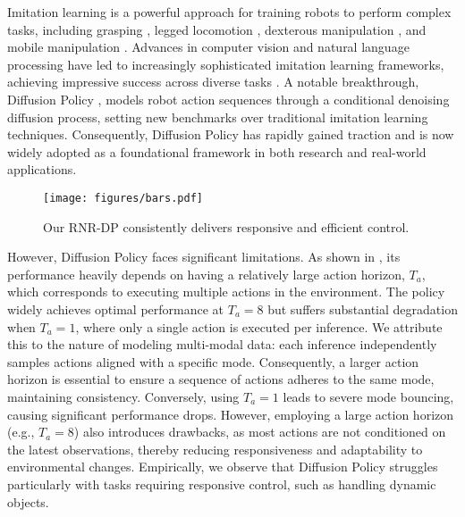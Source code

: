 Imitation learning is a powerful approach for training robots to perform complex tasks, including grasping \citep{johns2021coarse, xie2020deep, stepputtis2020language}, legged locomotion \citep{ratliff2007imitation, al2023locomujoco, yang2023generalized}, dexterous manipulation \citep{qin2022dexmv, radosavovic2021state}, and mobile manipulation \citep{wong2022error, du2022bayesian}. Advances in computer vision and natural language processing have led to increasingly sophisticated imitation learning frameworks, achieving impressive success across diverse tasks \citep{chen2021decision, abramson1970aloha, florence2022implicit, shafiullah2022behavior}. A notable breakthrough, Diffusion Policy \citep{chi2023diffusion}, models robot action sequences through a conditional denoising diffusion process, setting new benchmarks over traditional imitation learning techniques. Consequently, Diffusion Policy has rapidly gained traction and is now widely adopted as a foundational framework in both research and real-world applications.

\begin{wrapfigure}{r}{0.35\textwidth}
    \centering
    \vspace{-\baselineskip}
    \texttt{[image: figures/bars.pdf]}
    \vspace{-20pt}
    \caption{Our RNR-DP consistently delivers responsive and efficient control.}
    \label{fig:bars}
\end{wrapfigure}

However, Diffusion Policy faces significant limitations. As shown in \cite{chi2023diffusion}, its performance heavily depends on having a relatively large action horizon, \( T_a \), which corresponds to executing multiple actions in the environment. The policy widely achieves optimal performance at \( T_a = 8 \) but suffers substantial degradation when \( T_a = 1 \), where only a single action is executed per inference. We attribute this to the nature of modeling multi-modal data: each inference independently samples actions aligned with a specific mode. Consequently, a larger action horizon is essential to ensure a sequence of actions adheres to the same mode, maintaining consistency. Conversely, using \( T_a = 1 \) leads to severe mode bouncing, causing significant performance drops. However, employing a large action horizon (e.g., \( T_a = 8 \)) also introduces drawbacks, as most actions are not conditioned on the latest observations, thereby reducing responsiveness and adaptability to environmental changes. Empirically, we observe that Diffusion Policy struggles particularly with tasks requiring responsive control, such as handling dynamic objects.

